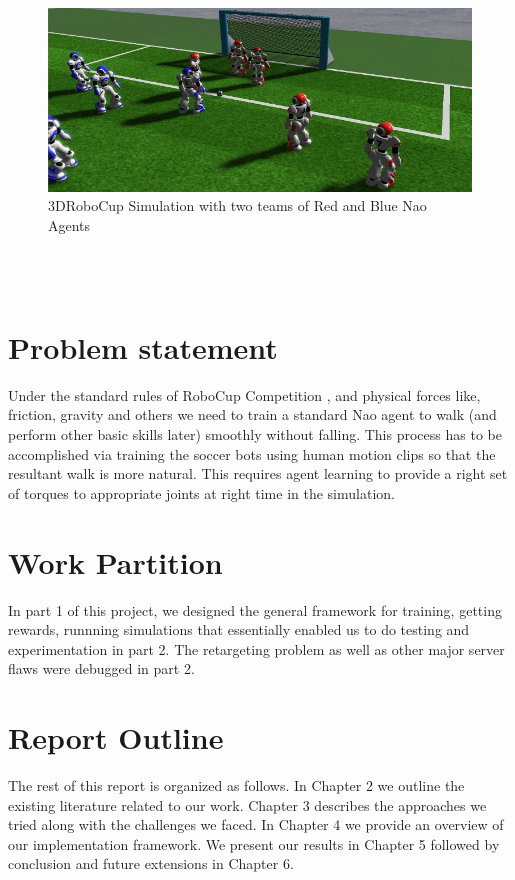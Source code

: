 \begin{figure}
\centering
  \includegraphics[width=\linewidth]{images/3DRoboCup.jpg}
  \caption{3DRoboCup Simulation with two teams of Red and Blue Nao Agents}
  \label{fig:robocup}
\end{figure}

\\\\
\section{Problem statement}
Under the standard rules of RoboCup Competition \cite{usermanual}, and physical forces like, friction, gravity and others we need to train a standard Nao agent to walk (and perform other basic skills later) smoothly without falling. This process has to be accomplished via training the soccer bots using human motion clips so that the resultant walk is more natural. This requires agent learning to provide a right set of torques to appropriate joints at right time in the simulation. 

\section {Work Partition}
In part 1 of this project, we designed the general framework for training, getting rewards, runnning simulations that essentially enabled us to do testing and experimentation in part 2. The retargeting problem as well as other major server flaws were debugged in part 2.
  
\section{Report Outline}
The rest of this report is organized as follows. In Chapter 2 we outline the existing literature related to our work. Chapter 3 describes the approaches we tried along with the challenges we faced. In Chapter 4 we provide an overview of our implementation framework. We present our results in Chapter 5 followed by conclusion and future extensions in Chapter 6.